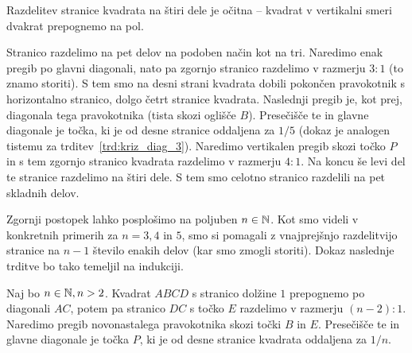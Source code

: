 Razdelitev stranice kvadrata na štiri dele je očitna -- kvadrat v vertikalni smeri dvakrat prepognemo na pol.

Stranico razdelimo na pet delov na podoben način kot na tri. Naredimo enak pregib po glavni diagonali, nato pa zgornjo stranico razdelimo v razmerju $3:1$ (to znamo storiti). S tem smo na desni strani kvadrata dobili pokončen pravokotnik s horizontalno stranico, dolgo četrt stranice kvadrata. Naslednji pregib je, kot prej, diagonala tega pravokotnika (tista skozi oglišče $B$). Presečišče te in glavne diagonale je točka, ki je od desne stranice oddaljena za $1/5$ (dokaz je analogen tistemu za trditev~\ref{trd:kriz_diag_3}). Naredimo vertikalen pregib skozi točko $P$ in s tem zgornjo stranico kvadrata razdelimo v razmerju $4:1$. Na koncu še levi del te stranice razdelimo na štiri dele. S tem smo celotno stranico razdelili na pet skladnih delov.

Zgornji postopek lahko posplošimo na poljuben $n \in \mathbb N$. Kot smo videli v konkretnih primerih za $n = 3, 4$ in $5$, smo si pomagali z vnajprejšnjo razdelitvijo stranice na $n-1$ število enakih delov (kar smo zmogli storiti). Dokaz naslednje trditve bo tako temeljil na indukciji.

\begin{trditev}
    Naj bo $n \in \mathbb N, n > 2$. Kvadrat $ABCD$ s stranico dolžine $1$ prepognemo po diagonali $AC$, potem pa stranico $DC$ s točko $E$ razdelimo v razmerju $(n-2):1$. Naredimo pregib novonastalega pravokotnika skozi točki $B$ in $E$. Presečišče te in glavne diagonale je točka $P$, ki je od desne stranice kvadrata oddaljena za $1/n$.
\end{trditev}

